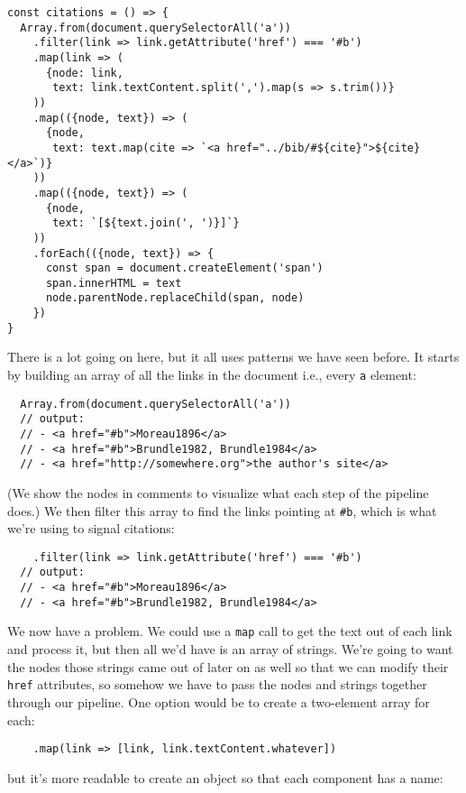 \begin{verbatim}
const citations = () => {
  Array.from(document.querySelectorAll('a'))
    .filter(link => link.getAttribute('href') === '#b')
    .map(link => (
      {node: link,
       text: link.textContent.split(',').map(s => s.trim())}
    ))
    .map(({node, text}) => (
      {node,
       text: text.map(cite => `<a href="../bib/#${cite}">${cite}</a>`)}
    ))
    .map(({node, text}) => (
      {node,
       text: `[${text.join(', ')}]`}
    ))
    .forEach(({node, text}) => {
      const span = document.createElement('span')
      span.innerHTML = text
      node.parentNode.replaceChild(span, node)
    })
}
\end{verbatim}

There is a lot going on here,
but it all uses patterns we have seen before.
It starts by building an array of all the links in the document
i.e., every \texttt{a} element:

\begin{verbatim}
  Array.from(document.querySelectorAll('a'))
  // output:
  // - <a href="#b">Moreau1896</a>
  // - <a href="#b">Brundle1982, Brundle1984</a>
  // - <a href="http://somewhere.org">the author's site</a>
\end{verbatim}

\noindent
(We show the nodes in comments to visualize what each step of the pipeline does.)
We then filter this array to find the links pointing at \texttt{\#b},
which is what we're using to signal citations:

\begin{verbatim}
    .filter(link => link.getAttribute('href') === '#b')
  // output:
  // - <a href="#b">Moreau1896</a>
  // - <a href="#b">Brundle1982, Brundle1984</a>
\end{verbatim}

We now have a problem.
We could use a \texttt{map} call to get the text out of each link and process it,
but then all we'd have is an array of strings.
We're going to want the nodes those strings came out of later on as well
so that we can modify their \texttt{href} attributes,
so somehow we have to pass the nodes and strings together through our pipeline.
One option would be to create a two-element array for each:

\begin{verbatim}
    .map(link => [link, link.textContent.whatever])
\end{verbatim}

\noindent
but it's more readable to create an object so that each component has a name:

